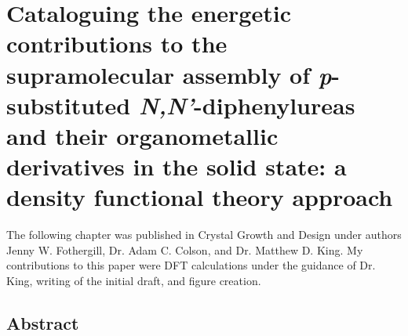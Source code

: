 \chapter{Cataloguing the energetic contributions to the supramolecular assembly of \textit{p}-substituted \textit{N,N'}-diphenylureas and their organometallic derivatives in the solid state: a density functional theory approach}
\label{chap:cataloguing}

The following chapter was published in Crystal Growth and Design under authors Jenny W. Fothergill, Dr. Adam C. Colson, and Dr. Matthew D. King. My contributions to this paper were DFT calculations under the guidance of Dr. King, writing of the initial draft, and figure creation.

\section{Abstract}

